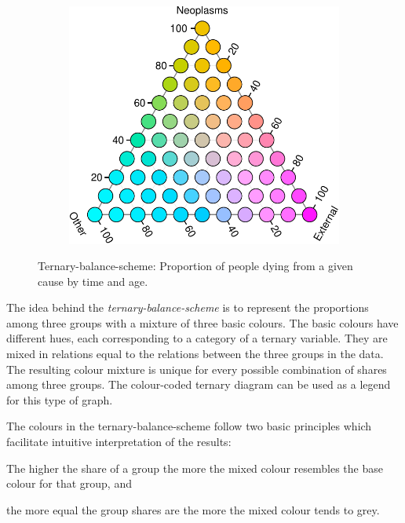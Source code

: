 \documentclass{scrartcl}
\begin{document}
\begin{figure}[!htb]
\begin{subfigure}[t]{0.65\textwidth}
    \label{fig:tbsplot}
    \end{subfigure}%
    ~
    \begin{subfigure}[t]{0.35\textwidth}
    \includegraphics[width = \linewidth]{../fig/tern_balance_lgnd.pdf}
    \label{fig:tbslegend1}
    \end{subfigure}%
    \caption{Ternary-balance-scheme: Proportion of people dying from a given cause by time and age.}
    \label{fig:tbs}
\end{figure}

The idea behind the \emph{ternary-balance-scheme} is to represent the proportions among three groups with a mixture of three basic colours. The basic colours have different hues, each corresponding to a category of a ternary variable. They are mixed in relations equal to the relations between the three groups in the data. The resulting colour mixture is unique for every possible combination of shares among three groups. The colour-coded ternary diagram can be used as a legend for this type of graph.

The colours in the ternary-balance-scheme follow two basic principles which facilitate intuitive interpretation of the results:

\begin{compactenum}
  \item The higher the share of a group the more the mixed colour resembles the base colour for that group, and
  \item the more equal the group shares are the more the mixed colour tends to grey.
\end{compactenum}
\end{document}
